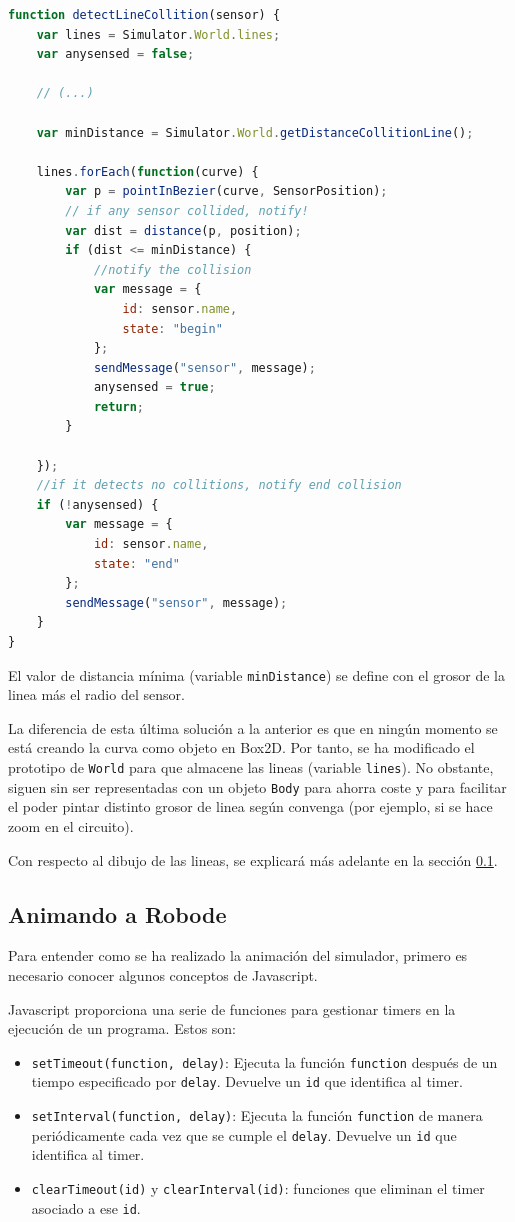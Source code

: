 \begin{lstlisting}[language={Javascript},label={code:deteccion-bezier}, caption={Función que detecta lineas (curvas de Bezier).}]
function detectLineCollition(sensor) {
	var lines = Simulator.World.lines;
	var anysensed = false;

	// (...)

	var minDistance = Simulator.World.getDistanceCollitionLine();

	lines.forEach(function(curve) {
		var p = pointInBezier(curve, SensorPosition);
		// if any sensor collided, notify!
		var dist = distance(p, position);
		if (dist <= minDistance) {
			//notify the collision
			var message = {
				id: sensor.name,
				state: "begin"
			};
			sendMessage("sensor", message);
			anysensed = true;
			return;
		}

	});
	//if it detects no collitions, notify end collision
	if (!anysensed) {
		var message = {
			id: sensor.name,
			state: "end"
		};
		sendMessage("sensor", message);
	}
}
\end{lstlisting}

El valor de distancia mínima (variable \texttt{minDistance}) se define con el grosor de la linea más el radio del sensor.

La diferencia de esta última solución a la anterior es que en ningún momento se está creando la curva como objeto en Box2D. Por tanto, se ha modificado el prototipo de \texttt{World} para que almacene las lineas (variable \texttt{lines}). No obstante, siguen sin ser representadas con un objeto \texttt{Body} para ahorra coste y para facilitar el poder pintar distinto grosor de linea según convenga (por ejemplo, si se hace zoom en el circuito).

Con respecto al dibujo de las lineas, se explicará más adelante en la sección \ref{animando-robode}.


\subsection{Animando a Robode}
\label{animando-robode}



Para entender como se ha realizado la animación del simulador, primero es necesario conocer algunos conceptos de Javascript.

Javascript proporciona una serie de funciones para gestionar timers en la ejecución de un programa. Estos son:

\begin{itemize}
	\item \texttt{setTimeout(function, delay)}: Ejecuta la función \texttt{function} después de un tiempo especificado por \texttt{delay}. Devuelve un \texttt{id} que identifica al timer.
	\item \texttt{setInterval(function, delay)}: Ejecuta la función \texttt{function} de manera periódicamente cada vez que se cumple el \texttt{delay}. Devuelve un \texttt{id} que identifica al timer.
	\item \texttt{clearTimeout(id)} y \texttt{clearInterval(id)}: funciones que eliminan el timer asociado a ese \texttt{id}.
\end{itemize}

